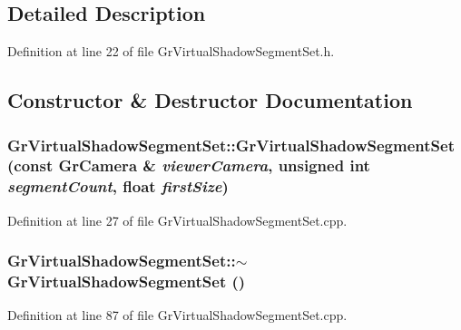 \subsection{Detailed Description}


Definition at line 22 of file GrVirtualShadowSegmentSet.h.

\subsection{Constructor \& Destructor Documentation}
\hypertarget{class_gr_virtual_shadow_segment_set_82e00df096614e8665e53a50555a2b8a}{
\subsubsection[{GrVirtualShadowSegmentSet}]{\setlength{\rightskip}{0pt plus 5cm}GrVirtualShadowSegmentSet::GrVirtualShadowSegmentSet (const {\bf GrCamera} \& {\em viewerCamera}, \/  unsigned int {\em segmentCount}, \/  float {\em firstSize})}}
\label{class_gr_virtual_shadow_segment_set_82e00df096614e8665e53a50555a2b8a}




Definition at line 27 of file GrVirtualShadowSegmentSet.cpp.\hypertarget{class_gr_virtual_shadow_segment_set_e91a62dfaca674a03d9a66a4df3d7f23}{
\subsubsection[{$\sim$GrVirtualShadowSegmentSet}]{\setlength{\rightskip}{0pt plus 5cm}GrVirtualShadowSegmentSet::$\sim$GrVirtualShadowSegmentSet ()}}
\label{class_gr_virtual_shadow_segment_set_e91a62dfaca674a03d9a66a4df3d7f23}




Definition at line 87 of file GrVirtualShadowSegmentSet.cpp.

